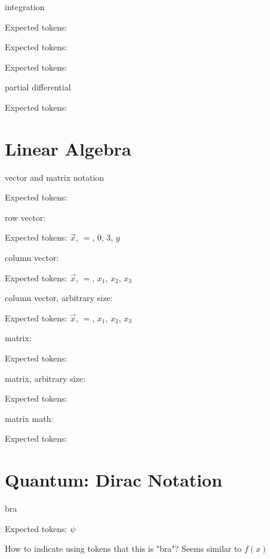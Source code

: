 \documentclass{article}
\begin{document}
\hrulefill


integration

Expected tokens: 

\hrulefill



Expected tokens: 

\hrulefill



Expected tokens: 

\hrulefill


partial differential

Expected tokens: 

\hrulefill


\section{Linear Algebra}
vector and matrix notation
    
Expected tokens: 

\hrulefill



row vector:

Expected tokens: $\vec{x}$, $=$, $0$, $3$, $y$

\hrulefill


column vector:

Expected tokens: $\vec{x}$, $=$, $x_1$, $x_2$, $x_3$

\hrulefill


column vector, arbitrary size:

Expected tokens: $\vec{x}$, $=$, $x_1$, $x_2$, $x_3$

\hrulefill



matrix:

Expected tokens: 

\hrulefill


matrix, arbitrary size:

Expected tokens: 

\hrulefill


matrix math:

Expected tokens: 

\hrulefill


\section{Quantum: Dirac Notation}

bra

Expected tokens: $\psi$

How to indicate using tokens that this is "bra"? Seems similar to $f(x)$
\end{document}
